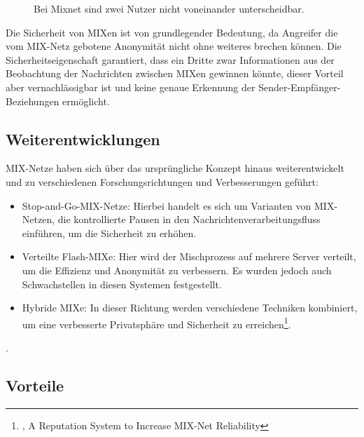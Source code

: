 \begin{figure}[h!]
    \centering
    
    \caption{Bei Mixnet sind zwei Nutzer nicht voneinander unterscheidbar.}
    \label{imgs:mixnet_transfer}
\end{figure}

Die Sicherheit von MIXen ist von grundlegender Bedeutung, da Angreifer die vom MIX-Netz gebotene Anonymität nicht ohne weiteres brechen können. Die Sicherheitseigenschaft garantiert, dass ein Dritte zwar Informationen aus der Beobachtung der Nachrichten zwischen MIXen gewinnen könnte, dieser Vorteil aber vernachlässigbar ist und keine genaue Erkennung der Sender-Empfänger-Beziehungen ermöglicht.

\subsection{Weiterentwicklungen}
\label{chap:mixnet_enhancements}

MIX-Netze haben sich über das ursprüngliche Konzept hinaus weiterentwickelt und zu verschiedenen Forschungsrichtungen und Verbesserungen geführt:

\begin{itemize}
    \item Stop-and-Go-MIX-Netze: Hierbei handelt es sich um Varianten von MIX-Netzen, die kontrollierte Pausen in den Nachrichtenverarbeitungsfluss einführen, um die Sicherheit zu erhöhen.
    \item Verteilte \glqq Flash-MIXe\grqq: Hier wird der Mischprozess auf mehrere Server verteilt, um die Effizienz und Anonymität zu verbessern. Es wurden jedoch auch Schwachstellen in diesen Systemen festgestellt.
    \item Hybride MIXe: In dieser Richtung werden verschiedene Techniken kombiniert, um eine verbesserte Privatsphäre und Sicherheit zu erreichen\footnote{\cite{MIXNetReliability}, A Reputation System to Increase MIX-Net Reliability}.
\end{itemize}.

\subsection{Vorteile}
\label{chap:mixnet_advantages}

